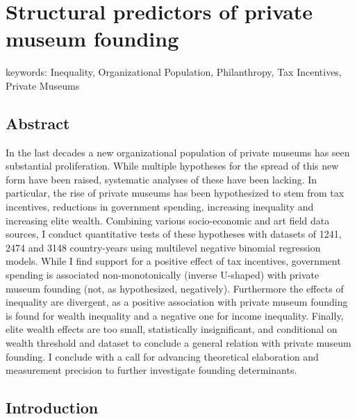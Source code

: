 \documentclass[11pt, authoryear]{elsarticle}
\author{}
\date{\today}
\title{}
\begin{document}
\section*{Structural predictors of private museum founding}

\noindent
keywords: Inequality, Organizational Population, Philanthropy, Tax Incentives, Private Museums  

\subsection*{Abstract}

In the last decades a new organizational population of private museums has seen substantial proliferation.
While multiple hypotheses for the spread of this new form have been raised, systematic analyses of these have been lacking.
In particular, the rise of private museums has been hypothesized to stem from tax incentives, reductions in government spending, increasing inequality and increasing elite wealth. 
Combining various socio-economic and art field data sources, I conduct quantitative tests of these hypotheses with datasets of 1241, 2474 and 3148 country-years using multilevel negative binomial regression models.
While I find support for a positive effect of tax incentives, government spending is associated non-monotonically (inverse U-shaped) with private museum founding (not, as hypothesized, negatively). 
Furthermore the effects of inequality are divergent, as a positive association with private museum founding is found for wealth inequality and a negative one for income inequality.
Finally, elite wealth effects are too small, statistically insignificant, and conditional on wealth threshold and dataset to conclude a general relation with private museum founding.
I conclude with a call for advancing theoretical elaboration and measurement precision to further investigate founding determinants. 





\subsection*{Introduction}
\end{document}
